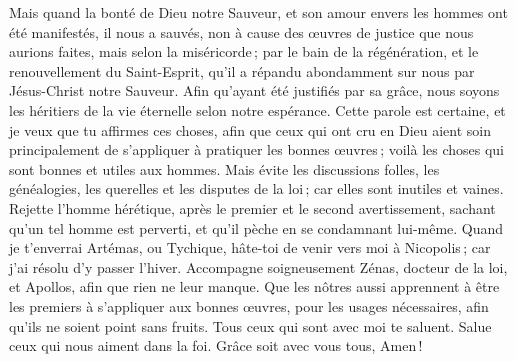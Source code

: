 \begin{multicols}{2}
Mais quand la bonté de Dieu notre Sauveur, et son amour envers les hommes ont été manifestés, il nous a sauvés,
non à cause des œuvres de justice que nous aurions faites, mais selon la miséricorde ; par le bain de la régénération, et le renouvellement du Saint-Esprit,
qu’il a répandu abondamment sur nous par Jésus-Christ notre Sauveur.
Afin qu'ayant été justifiés par sa grâce, nous soyons les héritiers de la vie éternelle selon notre espérance.
Cette parole est certaine, et je veux que tu affirmes ces choses, afin que ceux qui ont cru en Dieu aient soin principalement de s'appliquer à pratiquer les bonnes œuvres ; voilà les choses qui sont bonnes et utiles aux hommes.
Mais évite les discussions folles, les généalogies, les querelles et les disputes de la loi ; car elles sont inutiles et vaines.
Rejette l'homme hérétique, après le premier et le second avertissement,
sachant qu'un tel homme est perverti, et qu'il pèche en se condamnant lui-même.
Quand je t’enverrai Artémas, ou Tychique, hâte-toi de venir vers moi à Nicopolis ; car j'ai résolu d'y passer l'hiver.
Accompagne soigneusement Zénas, docteur de la loi, et Apollos, afin que rien ne leur manque.
Que les nôtres aussi apprennent à être les premiers à s'appliquer aux bonnes œuvres, pour les usages nécessaires, afin qu'ils ne soient point sans fruits.
Tous ceux qui sont avec moi te saluent. Salue ceux qui nous aiment dans la foi. Grâce soit avec vous tous, Amen !
\PPE{}
\end{multicols}
